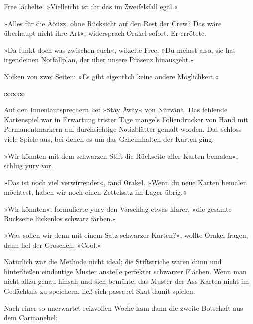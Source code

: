 Free lächelte. »Vielleicht ist ihr das im Zweifelsfall egal.«

»Alles für die Äöüzz, ohne Rücksicht auf den Rest der Crew? Das wäre überhaupt nicht ihre Art«, widersprach Orakel sofort. Er errötete.

»Da funkt doch was zwischen euch«, witzelte Free. »Du meinst also, sie hat irgendeinen Notfallplan, der über unsere Präsenz hinausgeht.«

Nicken von zwei Seiten: »Es gibt eigentlich keine andere Möglichkeit.«

\begin{center}
∞∞∞
\end{center}

Auf den Innenlautsprechern lief »Stäy Äwäy« von Nürvänä. Das fehlende Kartenspiel war in Erwartung trister Tage mangels Foliendrucker von Hand mit Permanentmarkern auf durchsichtige Notizblätter gemalt worden. Das schloss viele Spiele aus, bei denen es um das Geheimhalten der Karten ging.

»Wir könnten mit dem schwarzen Stift die Rückseite aller Karten bemalen«, schlug yury vor.

»Das ist noch viel verwirrender«, fand Orakel. »Wenn du neue Karten bemalen möchtest, haben wir noch einen Zettelsatz im Lager übrig.«

»Wir könnten«, formulierte yury den Vorschlag etwas klarer, »die gesamte Rückseite lückenlos schwarz färben.«

»Was sollen wir denn mit einem Satz schwarzer Karten?«, wollte Orakel fragen, dann fiel der Groschen. »Cool.«

Natürlich war die Methode nicht ideal; die Stiftstriche waren dünn und hinterließen eindeutige Muster anstelle perfekter schwarzer Flächen. Wenn man nicht allzu genau hinsah und sich bemühte, das Muster der Ass-Karten nicht im Gedächtnis zu speichern, ließ sich passabel Skat damit spielen.

Nach einer so unerwartet reizvollen Woche kam dann die zweite Botschaft aus dem Carinanebel:


